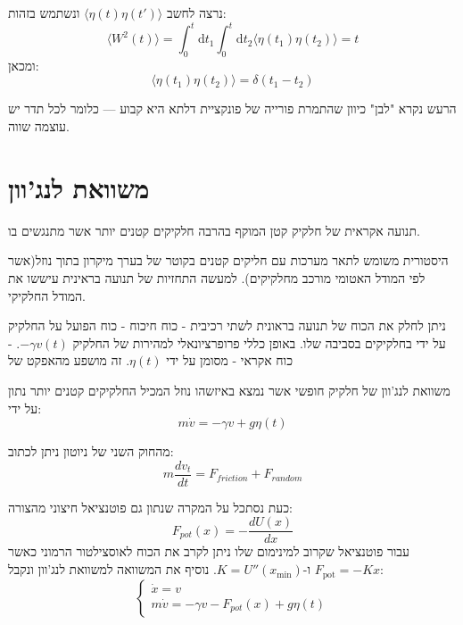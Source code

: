 \documentclass{tstextbook}
\begin{document}
\begin{proposition}
נרצה לחשב \(\langle \eta(t)\eta(t') \rangle\) ונשתמש בזהות:\\
$$\langle W^2(t) \rangle = \int_0^t \mathrm{d}t_1 \int_0^t \mathrm{d}t_2 \langle \eta(t_1) \eta(t_2) \rangle = t$$
ומכאן: 
$$\langle \eta(t_1) \eta(t_2) \rangle = \delta(t_1 - t_2)$$

\end{proposition}
\begin{remark}
הרעש נקרא "לבן" כיוון שהתמרת פורייה של פונקציית דלתא היא קבוע — כלומר לכל תדר יש עוצמה שווה.

\end{remark}
\section{משוואת לנג'וון}

\begin{definition}
תנועה אקראית של חלקיק קטן המוקף בהרבה חלקיקים קטנים יותר אשר מתנגשים בו.

\end{definition}
\begin{remark}
היסטורית משומש לתאר מערכות עם חליקים קטנים בקוטר של בערך מיקרון בתוך נוזל(אשר לפי המודל האטומי מורכב מחלקיקים). למעשה התחזיות של תנועה בראינית עיששו את המודל החלקיקי.

\end{remark}
\begin{proposition}
ניתן לחלק את הכוח של תנועה בראונית לשתי רכיבית
- כוח חיכוח - כוח הפועל על החלקיק על ידי בחלקיקים בסביבה שלו. באופן כללי פרופרציונאלי למהירות של החלקיק \(-\gamma v(t)\).
- כוח אקראי - מסומן על ידי \(\eta(t)\).  זה מושפע מהאפקט של 

\end{proposition}
\begin{proposition}
משוואת לנג'וון של חלקיק חופשי אשר נמצא באיזשהו נוזל המכיל החלקיקים קטנים יותר  נתון על ידי:
$$ m\dot{v} = -\gamma v + g\eta(t) $$

\end{proposition}
מהחוק השני של ניוטון ניתן לכתוב:
$$ m\frac{dv_t}{dt} = F_{friction} + F_{random} $$

כעת נסתכל על המקרה שנתון גם פוטנציאל חיצוני מהצורה:
$$ F_{pot}(x) = -\frac{dU(x)}{dx} $$
עבור פוטנציאל שקרוב למינימום שלו ניתן לקרב את הכוח לאוסצילטור הרמוני כאשר \(F_{\text{pot}}=-Kx\) ו-\(K=U''\left( x_{\text{min}} \right)\). נוסיף את המשוואה למשוואת לנג'וון ונקבל:
$$ \begin{cases} \dot{x} = v \\ m\dot{v} = -\gamma v - F_{pot}(x) + g\eta(t) \end{cases} $$
\end{document}
